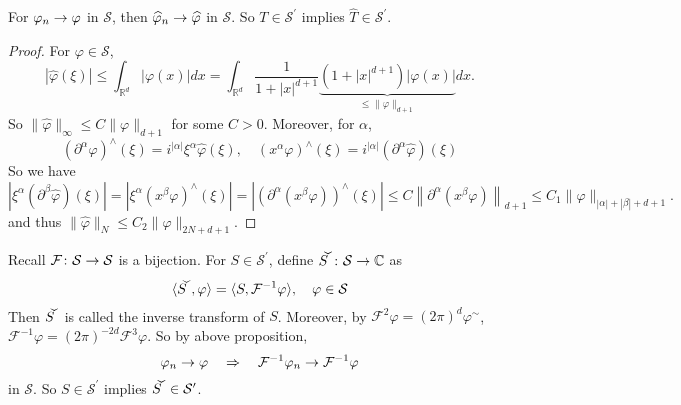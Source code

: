 \begin{enumerate}
	\begin{prop}
		For $\varphi_n \rightarrow \varphi$ in $\mathcal{S}$, then $\widehat{\varphi}_n \rightarrow \widehat{\varphi}$ in $\mathcal{S}$. So $T \in \mathcal{S}^\prime$ implies $\widehat{T} \in \mathcal{S}^\prime$.
	\end{prop}
	\begin{proof}
		For $\varphi \in \mathcal{S}$,
		\begin{equation*}
			|\widehat{\varphi}(\xi)| \leq \int_{\mathbb{R}^d}|\varphi(x)| d x=\int_{\mathbb{R}^d} \frac{1}{1+|x|^{d+1}} \underbrace{\left(1+|x|^{d+1}\right)|\varphi(x)|}_{\leq\|\varphi\|_{d+1}} d x .
		\end{equation*}
		So $\|\widehat{\varphi}\|_{\infty} \leq C\|\varphi\|_{d+1}$ for some $C> 0$. Moreover, for $\alpha$,
		\begin{equation*}
			\left(\partial^\alpha \varphi\right)^{\wedge}(\xi)=i^{|\alpha|} \xi^\alpha \widehat{\varphi}(\xi), \quad\left(x^\alpha \varphi\right)^{\wedge}(\xi)=i^{|\alpha|}\left(\partial^\alpha \widehat{\varphi}\right)(\xi)
		\end{equation*}
		So we have
		\begin{equation*}
			\left|\xi^\alpha\left(\partial^\beta \widehat{\varphi}\right)(\xi)\right|=\left|\xi^\alpha\left(x^\beta \varphi\right)^{\wedge}(\xi)\right|=\left|\left(\partial^\alpha\left(x^\beta \varphi\right)\right)^{\wedge}(\xi)\right| \leq C\left\|\partial^\alpha\left(x^\beta \varphi\right)\right\|_{d+1} \leq C_1\|\varphi\|_{|\alpha|+|\beta|+d+1} .
		\end{equation*}
		and thus $\|\widehat{\varphi}\|_N \leq C_2\|\varphi\|_{2 N+d+1}$.
	\end{proof}

	\noindent Recall $\mathcal{F} \colon \mathcal{S} \rightarrow \mathcal{S}$ is a bijection. For $S \in \mathcal{S}^\prime$, define $\widecheck{S} \colon \mathcal{S} \sto \C$ as
	\begin{equation*}
		\inn{\widecheck{S},\varphi} = \inn{S,\mathcal{F}^{-1}\varphi},\quad \varphi \in \mathcal{S}
	\end{equation*}
	Then $\widecheck{S}$ is called the inverse transform of $S$. Moreover, by $\mathcal{F}^2 \varphi=(2 \pi)^d \varphi^{\sim}$, $\mathcal{F}^{-1} \varphi=(2 \pi)^{-2 d} \mathcal{F}^3 \varphi$. So by above proposition,
	\begin{equation*}
		\varphi_n \rightarrow \varphi\quad \Rightarrow \quad \mathcal{F}^{-1} \varphi_n \rightarrow \mathcal{F}^{-1} \varphi
	\end{equation*}
	in $\mathcal{S}$. So $S \in \mathcal{S}^\prime$ implies $\widecheck{S} \in \mathcal{S}^\prime$.


\end{enumerate}
